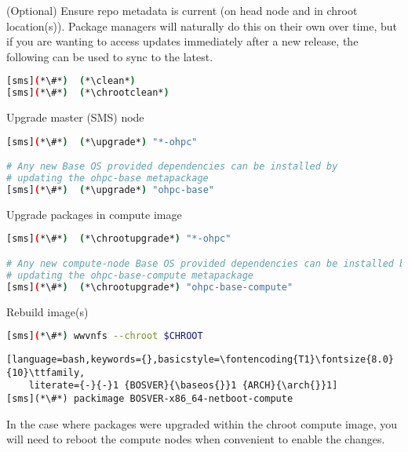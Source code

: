 \begin{enumerate*}
\item (Optional) Ensure repo metadata is current (on head node and in chroot
  location(s)). Package managers will naturally do this on their own over time,
  but if you are wanting to access updates immediately after a new release,
  the following can be used to sync to the latest.

\begin{lstlisting}[language=bash,keywords={}]
[sms](*\#*)  (*\clean*)
[sms](*\#*)  (*\chrootclean*)
\end{lstlisting}

\item Upgrade master (SMS) node

\begin{lstlisting}[language=bash,keywords={}]
[sms](*\#*)  (*\upgrade*) "*-ohpc"

# Any new Base OS provided dependencies can be installed by
# updating the ohpc-base metapackage
[sms](*\#*)  (*\upgrade*) "ohpc-base"
\end{lstlisting}
  
\item Upgrade packages in compute image

\begin{lstlisting}[language=bash,keywords={}]
[sms](*\#*)  (*\chrootupgrade*) "*-ohpc"

# Any new compute-node Base OS provided dependencies can be installed by
# updating the ohpc-base-compute metapackage
[sms](*\#*)  (*\chrootupgrade*) "ohpc-base-compute"
\end{lstlisting}
  
\item Rebuild image(s)

\begin{lstlisting}[language=bash,keywords={}]
[sms](*\#*) wwvnfs --chroot $CHROOT
\end{lstlisting}
\fi

\begin{lstlisting}[language=bash,keywords={},basicstyle=\fontencoding{T1}\fontsize{8.0}{10}\ttfamily,
    literate={-}{-}1 {BOSVER}{\baseos{}}1 {ARCH}{\arch{}}1]
[sms](*\#*) packimage BOSVER-x86_64-netboot-compute
\end{lstlisting}
\fi

\end{enumerate*}

\noindent In the case where packages were upgraded within the chroot compute image,
you will need to reboot the compute nodes when convenient to enable the
changes.

